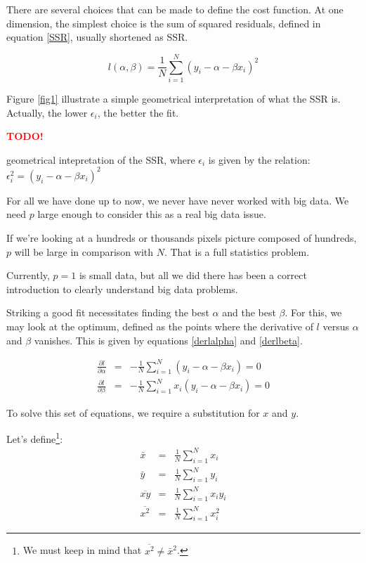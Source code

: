 \documentclass[a4paper]{tufte-book}
\newcommand{\TODO}{\textcolor{red}{\bf TODO!}\xspace}
\begin{document}
There are several choices that can be made to define the cost function. At one
dimension, the simplest choice is the sum of squared residuals, defined in
equation \ref{SSR}, usually shortened as SSR.

\begin{equation}
    l(\alpha,\beta) = \frac{1}{N} \sum_{i=1}^N (y_i - \alpha - \beta x_i )^2
    \label{SSR}
\end{equation} 

Figure \ref{fig1} illustrate a simple geometrical interpretation of what the SSR
is. Actually, the lower $\epsilon_i$, the better the fit.

\begin{marginfigure}
\TODO
\caption{geometrical intepretation of the SSR, where $\epsilon_i$ is given by the relation: $\epsilon_i^2 = (y_i - \alpha - \beta x_i)^2$}
\label{fig1}
\end{marginfigure}

For all we have done up to now, we never have never worked with big data. We
need $p$ large enough to consider this as a real big data issue.

If we’re looking at a hundreds or thousands pixels picture composed of hundreds, 
$p$ will be large in comparison with $N$. That is a full statistics problem.

Currently, $p=1$ is small data, but all we did there has been a correct
introduction to clearly understand big data problems.

Striking a good fit necessitates finding the best $\alpha$ and the best $\beta$.
For this, we may look at the optimum, defined as the points where the derivative
of $l$ versus $\alpha$ and $\beta$ vanishes. This is given by equations
\ref{derlalpha} and \ref{derlbeta}.

\begin{eqnarray}
    \frac{\partial l}{\partial \alpha} & = & - \frac{1}{N} \sum_{i=1}^N (y_i - \alpha - \beta x_i) = 0
    \label{derlalpha}\\
    \frac{\partial l}{\partial \beta} & =&  -\frac{1}{N} \sum_{i=1}^N x_i (y_i - \alpha -  \beta x_i) = 0
    \label{derlbeta}
\end{eqnarray}

To solve this set of equations, we require a substitution for $x$ and $y$.

Let’s define\footnote{We must keep in mind that $\overline{x^2} \neq \bar{x}^2$.}:
\begin{eqnarray}
    \bar{x} & = & \frac{1}{N} \sum_{i=1}^N x_i\\
    \bar{y} & = & \frac{1}{N} \sum_{i=1}^N y_i\\
    \overline{xy} & =&  \frac{1}{N} \sum_{i=1}^{N} x_i y_i\\
    \overline{x^2} & =&  \frac{1}{N} \sum_{i=1}^N x_i^2
\end{eqnarray}
\end{document}
